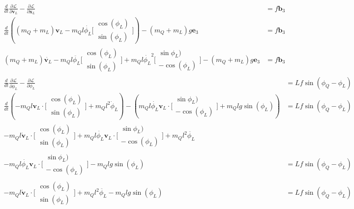 \documentclass[11pt]{article}
\begin{document}
\begin{align*}
\frac{d}{dt} \frac{\partial \mathcal{L}}{\partial \mathbf{v}_L} - \frac{\partial \mathcal{L}}{\partial \mathbf{x}_L} &= f \mathbf{b}_3 \\
\frac{d}{dt} \left( (m_Q+m_L) \mathbf{v}_L -m_Q l \dot{\phi_L} 
\bigl [ \begin{smallmatrix}
\cos(\phi_L) \\ \sin(\phi_L)
\end{smallmatrix} \bigr ] 
 \right) - (m_Q + m_L) g \mathbf{e}_3 &= f \mathbf{b}_3 \\
(m_Q+m_L) \dot{\mathbf{v}_L} - m_Q l \ddot{\phi_L} 
\bigl [ \begin{smallmatrix}
\cos(\phi_L) \\ \sin(\phi_L)
\end{smallmatrix} \bigr ] 
+ m_Q l \dot{\phi_L}^2 
\bigl [ \begin{smallmatrix}
\sin\phi_L) \\ -\cos(\phi_L)
\end{smallmatrix} \bigr ] 
 - (m_Q + m_L) g \mathbf{e}_3 &= f \mathbf{b}_3 
\end{align*}
\begin{align*}
\frac{d}{dt} \frac{\partial \mathcal{L}}{\partial \dot{\phi}_L} - \frac{\partial \mathcal{L}}{\partial \phi_L} &= Lf \sin(\phi_Q - \phi_L) \\
\frac{d}{dt} \left( -m_Q l \mathbf{v}_L \cdot 
\bigl [ \begin{smallmatrix}
\cos(\phi_L) \\ \sin(\phi_L)
\end{smallmatrix} \bigr ] 
+ m_Q l^2 \dot{\phi}_L \right) - \left( m_Q l \dot{\phi_L} \mathbf{v}_L \cdot 
\bigl [ \begin{smallmatrix}
\sin\phi_L) \\ -\cos(\phi_L)
\end{smallmatrix} \bigr ] 
+ m_Q l g \sin(\phi_L) \right) &=  Lf \sin(\phi_Q - \phi_L) \\
-m_Q l \dot{\mathbf{v}}_L \cdot 
\bigl [ \begin{smallmatrix}
\cos(\phi_L) \\ \sin(\phi_L)
\end{smallmatrix} \bigr ] 
+ m_Q l \dot{\phi_L} \mathbf{v}_L \cdot 
\bigl [ \begin{smallmatrix}
\sin\phi_L) \\ -\cos(\phi_L)
\end{smallmatrix} \bigr ] 
+ m_Q l^2 \ddot{\phi_L} \\
- m_Q l \dot{\phi_L} \mathbf{v}_L \cdot 
\bigl [ \begin{smallmatrix}
\sin\phi_L) \\ -\cos(\phi_L)
\end{smallmatrix} \bigr ] 
- m_Q l g \sin(\phi_L) &=  Lf \sin(\phi_Q - \phi_L) \\
-m_Q l \dot{\mathbf{v}}_L \cdot 
\bigl [ \begin{smallmatrix}
\cos(\phi_L) \\ \sin(\phi_L)
\end{smallmatrix} \bigr ] 
+ m_Q l^2 \ddot{\phi_L} - m_Q l g \sin(\phi_L) &=  Lf \sin(\phi_Q - \phi_L) 
\end{align*}
\end{document}
